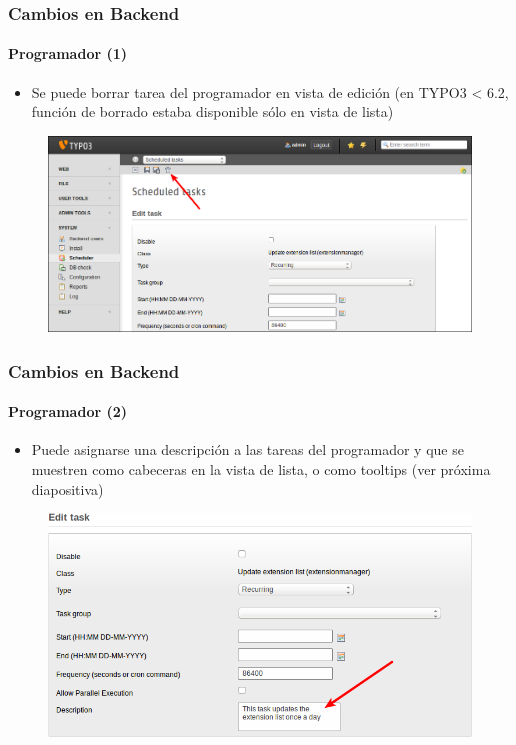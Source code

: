
\begin{frame}[fragile]
	\frametitle{Cambios en Backend}
	\framesubtitle{Programador (1)}

	\begin{itemize}
		\item Se puede borrar tarea del programador en vista de edición\newline
			\small(en TYPO3 < 6.2, función de borrado estaba disponible sólo en vista de lista)\normalsize
	\end{itemize}

	\begin{figure}
		\includegraphics[width=0.95\linewidth]{Images/BackendChanges/DeleteSchedulerTaskInEditView.png}
	\end{figure}

\end{frame}


\begin{frame}[fragile]
	\frametitle{Cambios en Backend}
	\framesubtitle{Programador (2)}

	\begin{itemize}
		\item Puede asignarse una descripción a las tareas del programador y que se muestren como cabeceras en la vista de lista, o como tooltips (ver próxima diapositiva)
	\end{itemize}

	\begin{figure}
		\includegraphics[width=0.7\linewidth]{Images/BackendChanges/SchedulerTaskDescription.png}
	\end{figure}

\end{frame}


